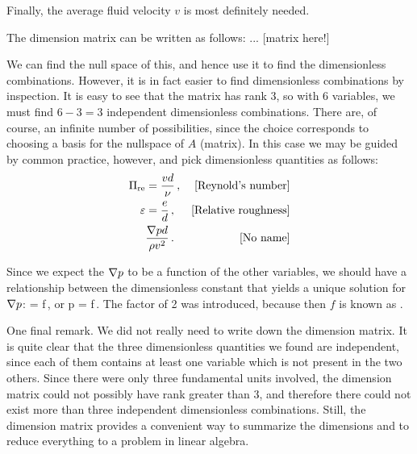 Finally, the average fluid velocity $v$ is most definitely needed.

The dimension matrix can be written as follows: ... [matrix here!]

We can find the null space of this, and hence use it to find the dimensionless combinations. However, it is in fact easier to find dimensionless combinations by inspection. It is easy to see that the matrix has rank 3, so with 6 variables, we must find $6 - 3 = 3$ independent dimensionless combinations. There are, of course, an infinite number of possibilities, since the choice corresponds to choosing a basis for the nullspace of $A$ (matrix). In this case we may be guided by common practice, however, and pick dimensionless quantities as follows:
\begin{align*}
       \Pi_\text{re} &= \dfrac{vd}{\nu}            \,,&\text{[{Reynold's number}]}\\
\varepsilon &= \dfrac{e}{d}               \,,&\text{[{Relative roughness}]}\\
         {} & \dfrac{\nabla p d}{\rho v^2}\,.&\text{[{No name}]}
\end{align*}

Since we expect the $\nabla p$ to be a function of the other variables, we should have a relationship between the dimensionless constant that yields a unique solution for $\nabla p$:
\beq
{} = f\vat{\rey, \varepsilon}\,,
\eeq
or
\beq
\gder p = f\vat{\rey, \varepsilon}\,.
\eeq
The factor of 2 was introduced, because then $f$ is known as .

One final remark. We did not really need to write down the dimension matrix. It is quite clear that the three dimensionless quantities we found are independent, since each of them contains at least one variable which is not present in the two others. Since there were only three fundamental units involved, the dimension matrix could not possibly have rank greater than 3, and therefore there could not exist more than three independent dimensionless combinations. Still, the dimension matrix provides a convenient way to summarize the dimensions and to reduce everything to a problem in linear algebra.


